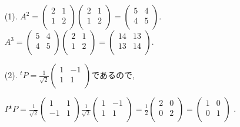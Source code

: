 \documentclass[dvipdfmx,a4paper,11pt]{article}
\theoremstyle{definition}
\begin{document}
  \vspace{11pt}
 
\hspace{-11pt}{\Large $\bullet$ 第3問解答例.}
\begin{itemize}
\item[(1).] 
$A^2 = 
\begin{pmatrix} %
2 & 1\\
1 & 2\\
 \end{pmatrix}
 \begin{pmatrix} %
2 & 1\\
1 & 2\\
 \end{pmatrix}
=
\begin{pmatrix} %
5 & 4\\
4 & 5\\
 \end{pmatrix}$.
 $A^3 = 
\begin{pmatrix} %
5 & 4\\
4 & 5\\
 \end{pmatrix}
 \begin{pmatrix} %
2 & 1\\
1 & 2\\
 \end{pmatrix}
=
\begin{pmatrix} %
14& 13\\
13 & 14\\
 \end{pmatrix}$.
 
 \item[(2).] 
 ${}^tP = \frac{1}{\sqrt{2}} 
\begin{pmatrix}
1& -1\\
1 & 1\\
 \end{pmatrix}$であるので, 
 
 $P{}^tP = 
 \frac{1}{\sqrt{2}} 
\begin{pmatrix} %
1& 1\\
-1 & 1\\
 \end{pmatrix}
 \frac{1}{\sqrt{2}} 
\begin{pmatrix}
1& -1\\
1 & 1\\
 \end{pmatrix}
 =
  \frac{1}{2} 
  \begin{pmatrix}
2& 0\\
0& 2\\
 \end{pmatrix}
 =
 \begin{pmatrix}
1& 0\\
0& 1\\
 \end{pmatrix}
 $ .
 

\end{itemize}
\end{document}
